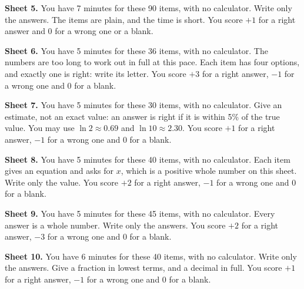 \begin{question}\label{iq:iv1:speed-drills:5}
\textbf{Sheet 5.} You have 7 minutes for these 90 items, with no calculator. Write only the answers. The items are plain, and the time is short. You score $+1$ for a right answer and 0 for a wrong one or a blank.

\end{question}
\clearpage

\begin{question}\label{iq:iv1:speed-drills:6}
\textbf{Sheet 6.} You have 5 minutes for these 36 items, with no calculator. The numbers are too long to work out in full at this pace. Each item has four options, and exactly one is right: write its letter. You score $+3$ for a right answer, $-1$ for a wrong one and 0 for a blank.

\end{question}
\clearpage

\begin{question}\label{iq:iv1:speed-drills:7}
\textbf{Sheet 7.} You have 5 minutes for these 30 items, with no calculator. Give an estimate, not an exact value: an answer is right if it is within 5\% of the true value. You may use $\ln 2 \approx 0.69$ and $\ln 10 \approx 2.30$. You score $+1$ for a right answer, $-1$ for a wrong one and 0 for a blank.

\end{question}
\clearpage

\begin{question}\label{iq:iv1:speed-drills:8}
\textbf{Sheet 8.} You have 5 minutes for these 40 items, with no calculator. Each item gives an equation and asks for $x$, which is a positive whole number on this sheet. Write only the value. You score $+2$ for a right answer, $-1$ for a wrong one and 0 for a blank.

\end{question}
\clearpage

\begin{question}\label{iq:iv1:speed-drills:9}
\textbf{Sheet 9.} You have 5 minutes for these 45 items, with no calculator. Every answer is a whole number. Write only the answers. You score $+2$ for a right answer, $-3$ for a wrong one and 0 for a blank.

\end{question}
\clearpage

\begin{question}\label{iq:iv1:speed-drills:10}
\textbf{Sheet 10.} You have 6 minutes for these 40 items, with no calculator. Write only the answers. Give a fraction in lowest terms, and a decimal in full. You score $+1$ for a right answer, $-1$ for a wrong one and 0 for a blank.

\end{question}
\clearpage

